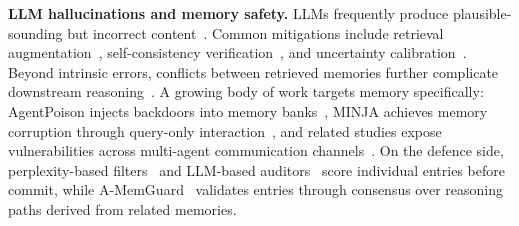\textbf{LLM hallucinations and memory safety.}
LLMs frequently produce plausible-sounding but incorrect content~\citep{banerjee2025llms,huang2025survey,ji2023survey,xu2024hallucination}. Common mitigations include retrieval augmentation~\citep{gao2023retrieval,lewis2020retrieval}, self-consistency verification~\citep{manakul2023selfcheckgpt,sriramanan2024llm}, and uncertainty calibration~\citep{kadavath2022language,saha2025you,tian2023just,xiong2023can}. Beyond intrinsic errors, conflicts between retrieved memories further complicate downstream reasoning~\citep{wang2025astute,wang2023resolving}. A growing body of work targets memory specifically: AgentPoison injects backdoors into memory banks~\citep{chen2024agentpoison}, MINJA achieves memory corruption through query-only interaction~\citep{dong2025memory,dong2025practical}, and related studies expose vulnerabilities across multi-agent communication channels~\citep{amayuelas2024multiagent,lee2024prompt,zhang2024agent}. On the defence side, perplexity-based filters~\citep{alon2023detecting} and LLM-based auditors~\citep{xiang2024guardagent} score individual entries before commit, while A-MemGuard~\citep{wei2025memguard} validates entries through consensus over reasoning paths derived from related memories.